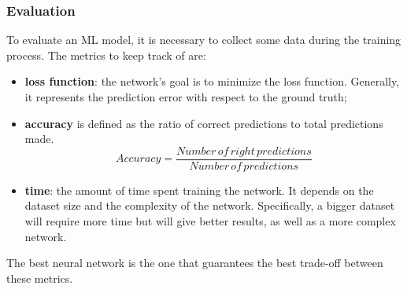 \documentclass[../thesis.tex]{subfiles}
\begin{document}
\subsubsection{Evaluation}
To evaluate an \gls{ML} model, it is necessary to collect some data during the training process. The metrics to keep track of are: 
\begin{itemize}
    \item \textbf{loss function}: the network's goal is to minimize the loss function. Generally, it represents the prediction error with respect to the ground truth;
    \item \textbf{accuracy} is defined as the ratio of correct predictions to total predictions made.
        \begin{equation}
                Accuracy = \frac{Number\, of\, right\, predictions}{Number\, of\, predictions}
        \end{equation}
    \item \textbf{time}: the amount of time spent training the network. It depends on the dataset size and the complexity of the network. Specifically, a bigger dataset will require more time but will give better results, as well as a more complex network. 
\end{itemize}
The best neural network is the one that guarantees the best trade-off between these metrics. 
\end{document}
